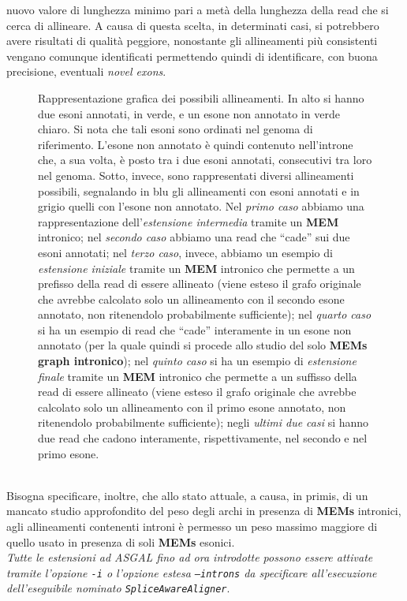 \documentclass[a4paper,12pt, oneside]{book}
\begin{document}
nuovo valore di lunghezza minimo pari a metà della lunghezza della read che si
cerca di allineare. A causa di questa scelta, in determinati casi, si potrebbero
avere risultati di qualità peggiore, nonostante gli allineamenti più consistenti
vengano comunque identificati permettendo quindi di identificare, con buona
precisione, eventuali \textit{novel exons}.
\begin{figure}
  \centering
  
  \caption{Rappresentazione grafica dei possibili allineamenti. In alto si hanno
    due esoni annotati, in verde, e un esone non annotato in verde
    chiaro. Si nota che tali esoni sono ordinati nel genoma di
    riferimento. L'esone non annotato è quindi contenuto nell'introne che, a sua
    volta, è posto tra i due esoni annotati, consecutivi tra loro nel
    genoma. Sotto, invece, sono rappresentati diversi allineamenti possibili,
    segnalando in blu gli allineamenti con esoni annotati e in grigio quelli con
    l'esone non 
    annotato. Nel \emph{primo caso} abbiamo una rappresentazione
    dell'\textit{estensione intermedia} tramite un \textbf{MEM} intronico; nel
    \emph{secondo caso} abbiamo una read che ``cade'' sui due esoni annotati;
    nel \emph{terzo caso}, invece, abbiamo un esempio di \textit{estensione
      iniziale} 
    tramite un \textbf{MEM} intronico che permette a un prefisso della read di
    essere allineato (viene esteso il grafo originale che avrebbe calcolato solo
    un allineamento con il secondo esone annotato, non ritenendolo probabilmente
    sufficiente); nel \emph{quarto caso} si ha un esempio di read che ``cade''
    interamente in un esone non annotato (per la quale quindi si procede allo
    studio del solo \textbf{MEMs graph intronico}); nel \emph{quinto caso} si
    ha un esempio di \textit{estensione finale} tramite un \textbf{MEM}
    intronico 
    che permette a un suffisso della read di essere allineato (viene esteso il
    grafo originale che avrebbe calcolato solo un allineamento con il primo
    esone annotato, non ritenendolo probabilmente sufficiente); negli
    \emph{ultimi due casi} si hanno due read che cadono interamente,
    rispettivamente, nel secondo e nel primo esone.}   
\end{figure}
\\Bisogna specificare, inoltre, che allo stato attuale, a causa, in primis, di un
mancato studio approfondito del peso degli archi in presenza di \textbf{MEMs}
intronici, agli allineamenti contenenti introni è permesso un peso massimo
maggiore di quello usato in presenza di soli \textbf{MEMs} esonici.\\
\textit{Tutte le estensioni ad ASGAL fino ad ora introdotte possono essere
  attivate 
  tramite l'opzione \texttt{-i} o l'opzione estesa \texttt{--introns} da
  specificare all'esecuzione dell'eseguibile nominato
  \texttt{SpliceAwareAligner}}.
\end{document}
